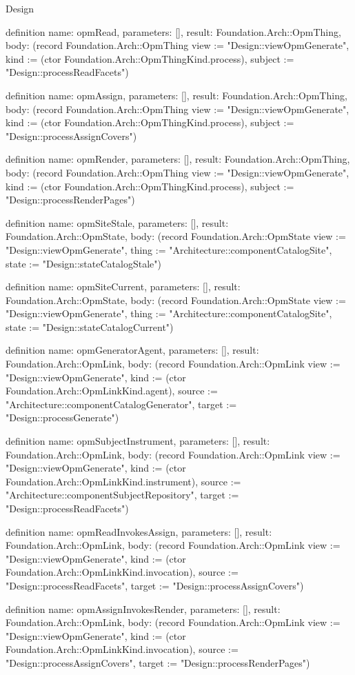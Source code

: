 \begin{lexlean}{Design}
\begin{semanticmodule}
definition{
  name: opmRead,
  parameters: [],
  result: Foundation.Arch::OpmThing,
  body: (record Foundation.Arch::OpmThing {view := "Design::viewOpmGenerate", kind := (ctor Foundation.Arch::OpmThingKind.process), subject := "Design::processReadFacets"})
}

definition{
  name: opmAssign,
  parameters: [],
  result: Foundation.Arch::OpmThing,
  body: (record Foundation.Arch::OpmThing {view := "Design::viewOpmGenerate", kind := (ctor Foundation.Arch::OpmThingKind.process), subject := "Design::processAssignCovers"})
}

definition{
  name: opmRender,
  parameters: [],
  result: Foundation.Arch::OpmThing,
  body: (record Foundation.Arch::OpmThing {view := "Design::viewOpmGenerate", kind := (ctor Foundation.Arch::OpmThingKind.process), subject := "Design::processRenderPages"})
}

definition{
  name: opmSiteStale,
  parameters: [],
  result: Foundation.Arch::OpmState,
  body: (record Foundation.Arch::OpmState {view := "Design::viewOpmGenerate", thing := "Architecture::componentCatalogSite", state := "Design::stateCatalogStale"})
}

definition{
  name: opmSiteCurrent,
  parameters: [],
  result: Foundation.Arch::OpmState,
  body: (record Foundation.Arch::OpmState {view := "Design::viewOpmGenerate", thing := "Architecture::componentCatalogSite", state := "Design::stateCatalogCurrent"})
}

definition{
  name: opmGeneratorAgent,
  parameters: [],
  result: Foundation.Arch::OpmLink,
  body: (record Foundation.Arch::OpmLink {view := "Design::viewOpmGenerate", kind := (ctor Foundation.Arch::OpmLinkKind.agent), source := "Architecture::componentCatalogGenerator", target := "Design::processGenerate"})
}

definition{
  name: opmSubjectInstrument,
  parameters: [],
  result: Foundation.Arch::OpmLink,
  body: (record Foundation.Arch::OpmLink {view := "Design::viewOpmGenerate", kind := (ctor Foundation.Arch::OpmLinkKind.instrument), source := "Architecture::componentSubjectRepository", target := "Design::processReadFacets"})
}

definition{
  name: opmReadInvokesAssign,
  parameters: [],
  result: Foundation.Arch::OpmLink,
  body: (record Foundation.Arch::OpmLink {view := "Design::viewOpmGenerate", kind := (ctor Foundation.Arch::OpmLinkKind.invocation), source := "Design::processReadFacets", target := "Design::processAssignCovers"})
}

definition{
  name: opmAssignInvokesRender,
  parameters: [],
  result: Foundation.Arch::OpmLink,
  body: (record Foundation.Arch::OpmLink {view := "Design::viewOpmGenerate", kind := (ctor Foundation.Arch::OpmLinkKind.invocation), source := "Design::processAssignCovers", target := "Design::processRenderPages"})
}


\end{semanticmodule}
\end{lexlean}
